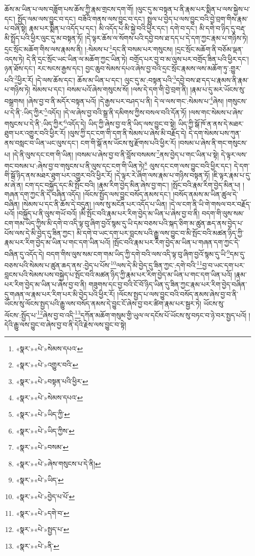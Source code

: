 ཆོས་མ་ཡིན་པ་ལས་བཟློག་པས་ཆོས་ཀྱི་རྣམ་གྲངས་དག་གོ། །ལུང་དུ་མ་བསྟན་པ་ནི་རྣམ་པར་སྨིན་པ་ལས་སྐྱེས་པ་དང་། སྤྱོད་ལམ་ལས་བྱུང་བ་དང་། བཟོའི་གནས་ལས་བྱུང་བ་དང་། སྤྲུལ་པ་བྱེད་པ་ལས་བྱུང་བའི་བྱེ་བྲག་གིས་རྣམ་པ་བཞི་སྟེ། རྣམ་པར་སྨིན་པ་འདོད་པ་དང་། མི་འདོད་པ་མི་སྐྱེ་བའི་ཕྱིར་དང་། དགེ་བ་དང་། མི་དགེ་བ་ཉིད་དུ་བརྡ་མི་སྤྲོད་པའི་ཕྱིར་ལུང་དུ་མ་བསྟན་ཏོ། །དེ་ལྟར་ཆོས་ལ་སོགས་པའི་དབྱེ་བས་ཐ་དད་པ་དེ་དག་ཀྱང་རྣམ་པ་གཉིས་ཏེ། དྲང་སྲོང་མཆོག་གིས་ལས་རྣམས་ནི། །:སེམས་པ་\footnote{«སྣར་»«པེ་»སེམས་དཔའ་}དང་ནི་བསམ་པར་གསུངས། །དྲང་སྲོང་མཆོག་ནི་བཅོམ་ལྡན་འདས་ཏེ། དེ་ནི་དྲང་སྲོང་ཡང་ཡིན་ལ་མཆོག་ཀྱང་ཡིན་ཏེ། བགྲོད་པར་བྱ་བ་མ་ལུས་པར་བགྲོད་ཟིན་པའི་ཕྱིར་དང་། ཉན་ཐོས་དང་། རང་སངས་རྒྱས་དང་། བྱང་ཆུབ་སེམས་དཔའ་ཞེས་བྱ་བའི་དྲང་སྲོང་རྣམས་ལས་མཆོག་ཏུ་:གྱུར་པའི་\footnote{«སྣར་»«པེ་»འགྱུར་བའི་}ཕྱིར་རོ། །དེ་ལས་ཆོས་དང་། ཆོས་མ་ཡིན་པ་དང་། ལུང་དུ་མ་:བསྟན་པའི་\footnote{«སྣར་»«པེ་»བསྟན་པའི་ཕྱིར་}དབྱེ་བས་ཐ་དད་པ་རྣམས་ནི་རྣམ་པ་གཉིས་ཏེ། སེམས་པ་དང་། བསམ་པའོ་ཞེས་གསུངས་སོ། །ལས་དེ་དག་གི་བྱེ་བྲག་ནི། །རྣམ་པ་དུ་མར་ཡོངས་སུ་བསྒྲགས། །ཞེས་བྱ་བ་ནི་མདོར་བསྟན་པའོ། །དེ་རྒྱས་པར་བཤད་པ་ནི། དེ་ལ་ལས་གང་:སེམས་པ་\footnote{«སྣར་»«པེ་»སེམས་དཔའ་}ཞེས། །གསུངས་པ་དེ་ནི་:ཡིད་ཀྱིར་\footnote{«སྣར་»«པེ་»ཡིད་ཀྱི་}འདོད། །དེ་ལ་ཞེས་བྱ་བའི་སྒྲ་ནི་དམིགས་ཀྱིས་བསལ་བའི་དོན་ཏོ། །ལས་གང་སེམས་པ་ཞེས་གསུངས་པ་དེ་ནི་:ཡིད་ཀྱིར་\footnote{«སྣར་»«པེ་»ཡིད་ཀྱིས་}འདོད་དེ། ཡིད་ཀྱི་ཞེས་བྱ་བ་ནི་ཡིད་ལས་བྱུང་བ་སྟེ། ཡིད་ཀྱི་སྒོ་ཁོ་ན་ནས་དེ་མཐར་ཐུག་པར་འགྱུར་བའི་ཕྱིར་རོ། །ལུས་ཀྱི་དང་ངག་གི་དག་ནི་སེམས་པ་ཞེས་མི་བརྗོད་དེ། དེ་དག་སེམས་པས་ཀུན་ནས་བསླང་བ་ཡིན་ཡང་ལུས་དང་། ངག་གི་སྒོ་ནས་ཡོངས་སུ་རྫོགས་པའི་ཕྱིར་རོ། །བསམ་པ་ཞེས་ནི་གང་གསུངས་པ། །དེ་ནི་ལུས་དང་ངག་གི་ཡིན། །བསམ་པ་ཞེས་བྱ་བ་ནི་བློས་བསམས་\footnote{«སྣར་»«པེ་»བསམ་}ནས་བྱེད་པ་གང་ཡིན་པ་སྟེ། དེ་ལྟར་ལས་གང་བསམ་པ་:ཞེས་བྱ་བ་གསུངས་པ་ནི་ལུས་དང་ངག་གི་ཡིན་ཏེ།\footnote{«སྣར་»«པེ་»ཞེས་གསུངས་པ་དེ་ནི།} ལུས་དང་ངག་ལས་བྱུང་བའི་ཕྱིར་དང་། དེ་དག་གི་སྒོ་ཉིད་ནས་མཐར་ཐུག་པར་འགྱུར་བའི་ཕྱིར་རོ། །དེ་ལྟར་རེ་ཞིག་ལས་རྣམ་པ་གཉིས་བསྟན་ཏོ། །ཇི་ལྟར་རྣམ་པ་དུ་མ་ཞེ་ན། ངག་དང་བསྐྱོད་དང་མི་སྤོང་བའི། །རྣམ་རིག་བྱེད་མིན་ཞེས་བྱ་གང་། །སྤོང་བའི་རྣམ་རིག་བྱེད་མིན་པ། །གཞན་དག་ཀྱང་ནི་དེ་བཞིན་འདོད། །ལོངས་སྤྱོད་ལས་བྱུང་བསོད་ནམས་དང་། །བསོད་ནམས་མ་ཡིན་ཚུལ་དེ་བཞིན། །སེམས་པ་དང་ནི་ཆོས་དེ་བདུན། །ལས་སུ་མངོན་པར་འདོད་པ་ཡིན། །དེ་ལ་ངག་ནི་ཡི་གེ་གསལ་བར་བརྗོད་པའོ། །བསྐྱོད་པ་ནི་ལུས་གཡོ་བའོ། །མི་སྤོང་བའི་རྣམ་པར་རིག་བྱེད་མ་ཡིན་པ་ཞེས་བྱ་བ་ནི། བདག་གི་ལུས་སམ་ངག་གམ་ཡིད་ཀྱིས་མི་དགེ་བ་འདི་ལྟ་བུ་ཞིག་བྱའོ་སྙམ་དུ་ཡི་དམ་བཅས་པའི་སྐད་ཅིག་མ་ཚུན་ཆད་ནས་བྱེད་པ་པོས་ལས་དེ་མི་བྱེད་དུ་ཟིན་ཀྱང་། མི་དགེ་བ་ཡང་དག་པར་བླངས་པའི་རྒྱུ་ལས་བྱུང་བ་མི་སྤོང་བའི་མཚན་ཉིད་ཀྱི་རྣམ་པར་རིག་བྱེད་མ་ཡིན་པ་གང་དག་ཡིན་པའོ། །སྤོང་བའི་རྣམ་པར་རིག་བྱེད་མ་ཡིན་པ་གཞན་དག་ཀྱང་དེ་བཞིན་དུ་འདོད་དེ། བདག་གིས་ལུས་སམ་ངག་གམ་ཡིད་ཀྱི་དགེ་བའི་ལས་འདི་ལྟ་བུ་ཞིག་བྱའོ་སྙམ་དུ་ཡི་\footnote{«སྣར་»«པེ་»ཡིད་}དམ་དུ་བཅས་པའི་སེམས་པ་ཚུན་ཆད་ནས་:བྱེད་པ་པོས་\footnote{«སྣར་»«པེ་»བྱེད་པ་པོ་}ལས་དེ་མི་བྱེད་དུ་ཟིན་ཀྱང་:དགེ་བའི་\footnote{«སྣར་»«པེ་»དགེ་བ་}བྱ་བ་ཡང་དག་པར་བླངས་པའི་སེམས་པས་བསྐྱེད་པ་སྤོང་བའི་མཚན་ཉིད་ཀྱི་རྣམ་པར་རིག་བྱེད་མ་ཡིན་པ་གང་དག་ཡིན་པའོ། །རྣམ་པར་རིག་བྱེད་མ་ཡིན་པ་ཞེས་བྱ་བ་ནི། གཟུགས་དང་བྱ་བའི་ངོ་བོ་ཉིད་ཡིན་དུ་ཟིན་ཀྱང་རྣམ་པར་རིག་བྱེད་བཞིན་དུ་གཞན་ལ་རྣམ་པར་རིག་པར་མི་བྱེད་པའི་ཕྱིར་རོ། །ལོངས་སྤྱད་པ་ལས་བྱུང་བའི་བསོད་ནམས་ཞེས་བྱ་བ་ནི་ཡོངས་སུ་ལོངས་སྤྱད་པའི་རྒྱུ་ལས་བསོད་ནམས་དེ་བྱུང་ངོ་ཞེས་བྱ་བར་ཚིག་རྣམ་པར་སྦྱར་ཏེ། ཡོངས་སུ་ལོངས་:སྤྱོད་པ་\footnote{«སྣར་»«པེ་»སྤྱད་པ་}ཞེས་བྱ་བ་འདི་\footnote{«སྣར་»«པེ་»ནི་}དཀོན་མཆོག་གསུམ་གྱི་ཡུལ་ལ་དངོས་པོ་ཡོངས་སུ་བཏང་བ་ཉེ་བར་སྤྱད་པའོ། །དེའི་རྒྱུ་ལས་བྱུང་བ་ཞེས་བྱ་བ་ནི་དེའི་རྗེས་ལས་བྱུང་བ་སྟེ། 